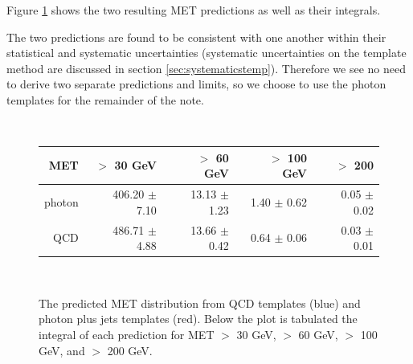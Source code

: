 Figure \ref{fig:comptemp} shows the two resulting MET predictions as well as their integrals.

The two predictions are found to be consistent with one another within their statistical and 
systematic uncertainties (systematic uncertainties on the template method are discussed in 
section \ref{sec:systematicstemp}). Therefore we see no need to derive two separate predictions 
and limits, so we choose to use the photon templates for the remainder of the note.

\begin{figure}[hbt]
  \begin{center}
	\\ \medskip
    \begin{tabular}{r|r|r|r|r}
      MET    & $>$ 30 GeV       & $>$ 60 GeV        & $>$ 100 GeV       & $>$ 200  \\ \hline

	  photon & 406.20 $\pm$   7.10 &  13.13 $\pm$   1.23 &   1.40 $\pm$   0.62 &   0.05 $\pm$   0.02 \\
	  QCD    & 486.71 $\pm$   4.88 &  13.66 $\pm$   0.42 &   0.64 $\pm$   0.06 &   0.03 $\pm$   0.01 \\

    \end{tabular}
	\\ \medskip
    \caption{The predicted MET distribution from QCD templates (blue) and photon plus jets
	  templates (red). %
	  Below the plot is tabulated the integral of each prediction for
	  MET $>$ 30 GeV, $>$ 60 GeV, $>$ 100 GeV, and $>$ 200 GeV. 
	}
    \label{fig:comptemp}
  \end{center}
\end{figure}
